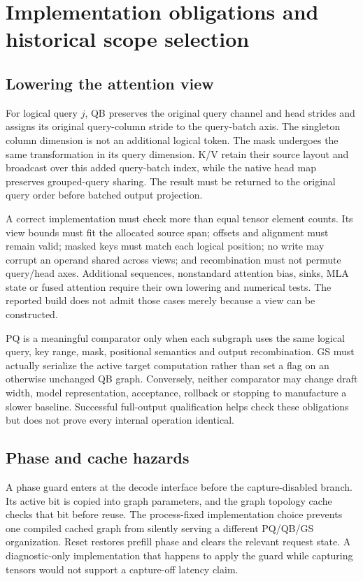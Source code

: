 \section{Implementation obligations and historical scope selection}
\label{supp:implementation}
\subsection{Lowering the attention view}
For logical query $j$, QB preserves the original query channel and head strides and assigns its original query-column stride to the query-batch axis. The singleton column dimension is not an additional logical token. The mask undergoes the same transformation in its query dimension. K/V retain their source layout and broadcast over this added query-batch index, while the native head map preserves grouped-query sharing. The result must be returned to the original query order before batched output projection.

A correct implementation must check more than equal tensor element counts. Its view bounds must fit the allocated source span; offsets and alignment must remain valid; masked keys must match each logical position; no write may corrupt an operand shared across views; and recombination must not permute query/head axes. Additional sequences, nonstandard attention bias, sinks, MLA state or fused attention require their own lowering and numerical tests. The reported build does not admit those cases merely because a view can be constructed.

PQ is a meaningful comparator only when each subgraph uses the same logical query, key range, mask, positional semantics and output recombination. GS must actually serialize the active target computation rather than set a flag on an otherwise unchanged QB graph. Conversely, neither comparator may change draft width, model representation, acceptance, rollback or stopping to manufacture a slower baseline. Successful full-output qualification helps check these obligations but does not prove every internal operation identical.

\subsection{Phase and cache hazards}
A phase guard enters at the decode interface before the capture-disabled branch. Its active bit is copied into graph parameters, and the graph topology cache checks that bit before reuse. The process-fixed implementation choice prevents one compiled cached graph from silently serving a different PQ/QB/GS organization. Reset restores prefill phase and clears the relevant request state. A diagnostic-only implementation that happens to apply the guard while capturing tensors would not support a capture-off latency claim.

